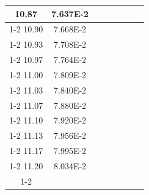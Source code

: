 \documentclass[article,12pt]{elsarticle}
\begin{document}
\begin{longtable}[c]{|c|c|cccccc}
10.87    & 7.637E-2  &                       &                              &                            &                       &                              &                               \\ \cline{1-2}
10.90    & 7.668E-2  &                       &                              &                            &                       &                              &                               \\ \cline{1-2}
10.93    & 7.708E-2  &                       &                              &                            &                       &                              &                               \\ \cline{1-2}
10.97    & 7.764E-2  &                       &                              &                            &                       &                              &                               \\ \cline{1-2}
11.00    & 7.809E-2  &                       &                              &                            &                       &                              &                               \\ \cline{1-2}
11.03    & 7.840E-2  &                       &                              &                            &                       &                              &                               \\ \cline{1-2}
11.07    & 7.880E-2  &                       &                              &                            &                       &                              &                               \\ \cline{1-2}
11.10    & 7.920E-2  &                       &                              &                            &                       &                              &                               \\ \cline{1-2}
11.13    & 7.956E-2  &                       &                              &                            &                       &                              &                               \\ \cline{1-2}
11.17    & 7.995E-2  &                       &                              &                            &                       &                              &                               \\ \cline{1-2}
11.20    & 8.034E-2  &                       &                              &                            &                       &                              &                               \\ \cline{1-2}

\end{longtable}
\end{document}
